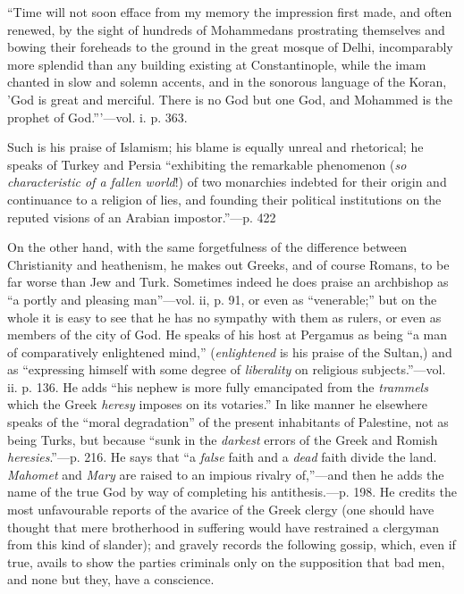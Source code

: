 ``Time
will not soon efface from my memory the impression first made, and often
renewed, by the sight of hundreds of Mohammedans prostrating themselves
and bowing their foreheads to the ground in the great mosque of Delhi,
incomparably more splendid than any building existing at Constantinople,
while the imam chanted in slow and solemn accents, and in the sonorous
language of the Koran, 'God is great and merciful. There is no God but
one God, and Mohammed is the prophet of God.'''—vol. i. p. 363.

Such is his
praise of Islamism; his blame is equally unreal and rhetorical; he
speaks of Turkey and Persia ``exhibiting the remarkable phenomenon (\emph{so
characteristic of a fallen world}!) of two monarchies indebted for
their origin and continuance to a religion of lies, and founding their
political institutions on the reputed visions of an Arabian impostor.''—p.
422

On the
other hand, with the same forgetfulness of the difference between
Christianity and heathenism, he makes out Greeks, and of course Romans,
to be far worse than Jew and Turk. Sometimes indeed he does praise an
archbishop as ``a portly and pleasing man''—vol. ii, p. 91, or even as ``venerable;''
but on the whole it is easy to see that he has no sympathy with them as
rulers, or even as members of the city of God. He speaks of his host at
Pergamus as being ``a man of comparatively enlightened mind,'' (\emph{enlightened}
is his praise of the Sultan,) and as ``expressing himself with some
degree of \emph{liberality} on religious subjects.''—vol. ii. p. 136.
He adds ``his nephew is more fully emancipated from the \emph{trammels}
which the Greek \emph{heresy} imposes on its votaries.'' In like manner
he elsewhere speaks of the ``moral degradation'' of the present
inhabitants of Palestine, not as being Turks, but because ``sunk in the \emph{darkest}
errors of the Greek and Romish \emph{heresies}.''—p. 216. He says that ``a
\emph{false} faith and a \emph{dead} faith divide the land. \emph{Mahomet}
and \emph{Mary} are raised to an impious rivalry of,''—and then he adds
the name of the true God by way of completing his antithesis.—p. 198.
He credits the most unfavourable reports of the avarice of the
Greek clergy (one should have thought that mere brotherhood in suffering
would have restrained a clergyman from this kind of slander); and
gravely records the following gossip, which, even if true, avails to
show the parties criminals only on the supposition that bad men, and
none but they, have a conscience.

